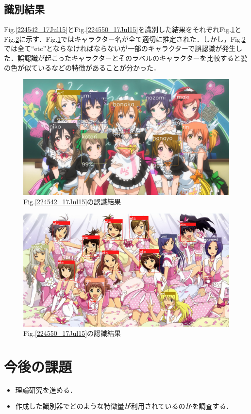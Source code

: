\documentclass[a4paper,10pt]{jsarticle}
\begin{document}
\subsection{識別結果}
Fig.\ref{224542_17Jul15}とFig.\ref{224550_17Jul15}を識別した結果をそれぞれFig.\ref{224817_17Jul15}とFig.\ref{224823_17Jul15}に示す．Fig.\ref{224817_17Jul15}ではキャラクター名が全て適切に推定された．しかし，Fig.\ref{224823_17Jul15}では全て``etc''とならなければならないが一部のキャラクターで誤認識が発生した．誤認識が起こったキャラクターとそのラベルのキャラクターを比較すると髪の色が似ているなどの特徴があることが分かった．
\begin{figure}[bt]
 \centering
 \includegraphics[width=140mm]{fig/jpg/result_lovelive.jpg}
 \caption{Fig.\ref{224542_17Jul15}の認識結果 }
 \label{224817_17Jul15}
\end{figure}
\begin{figure}[bt]
 \centering
 \includegraphics[width=140mm]{fig/jpg/result_idolmaster.jpg}
 \caption{Fig.\ref{224550_17Jul15}の認識結果 }
 \label{224823_17Jul15}
\end{figure}



\section{今後の課題}
\begin{itemize}
 \item 理論研究を進める．
 \item 作成した識別器でどのような特徴量が利用されているのかを調査する．
\end{itemize}
\end{document}
